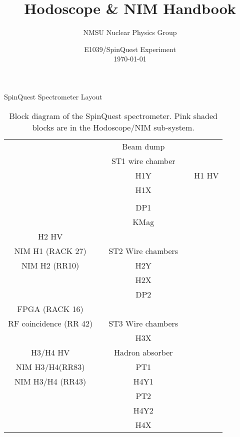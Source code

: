 \documentclass[10pt, xcolor={dvipsnames}, aspectratio = 169, sans,mathserif]{beamer}
\title{Hodoscope \& NIM Handbook}
\author{NMSU Nuclear Physics Group}
\date{E1039/SpinQuest Experiment
\\ \today}
\begin{document}
\begin{frame}
    \maketitle
\end{frame}


\begin{frame}[fragile]{SpinQuest Spectrometer Layout}

\begin{footnotesize}
\begin{table}
\begin{center}
\begin{tabular}{ c c c c c } 
  & & Beam dump & & \\
  & & ST1 wire chamber & & \\
  & & \cellcolor{red!25} H1Y & & \cellcolor{red!25} H1 HV \\
  & & \cellcolor{red!25} H1X & & \\
  & & & & \\
  & & DP1 & \\
  & & KMag & \\
\cellcolor{red!25} H2 HV & & & &  \\
\cellcolor{red!25} NIM H1  (RACK 27) & & ST2 Wire chambers  & & \\
\cellcolor{red!25} NIM H2 (RR10) & & \cellcolor{red!25} H2Y  & & \\
 & & \cellcolor{red!25} H2X & & \\
  & & \cellcolor{red!25} DP2 & & \\
\cellcolor{red!25} FPGA (RACK 16) & & & & \\
\cellcolor{red!25} RF coincidence (RR 42) & & ST3 Wire chambers & & \\
 & & \cellcolor{red!25} H3X & & \\
\cellcolor{red!25} H3/H4 HV & & Hadron absorber & & \\
\cellcolor{red!25} NIM H3/H4(RR83) & & PT1 & & \\
\cellcolor{red!25} NIM H3/H4 (RR43) & & \cellcolor{red!25} H4Y1 && \\
 & & PT2 & & \\
 & & \cellcolor{red!25} H4Y2 & & \\
  & & \cellcolor{red!25} H4X & & 
\end{tabular}
\caption{Block diagram of the SpinQuest spectrometer. Pink shaded blocks are in the Hodoscope/NIM sub-system.}
\end{center}
\end{table}
\end{footnotesize}

\end{frame}
\end{document}

